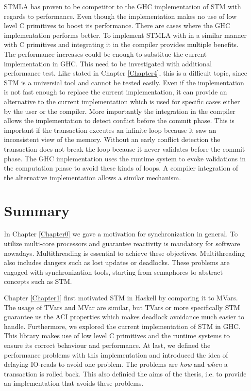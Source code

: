 STMLA has proven to be competitor to the GHC implementation of STM with regards to performance. Even 
though the implementation makes no use of low level C primitives to boost its performance. There are 
cases where the GHC implementation performs better. To implement STMLA with in a similar manner 
with C primitives and integrating it in the compiler provides multiple benefits. The performance 
increases could be enough to substitue the current implementation in GHC. This need to be investigated
with additional performance test. Like stated in Chapter \ref{Chapter4}, this is a difficult topic,
since STM is a universial tool and cannot be tested easily. Even if the implementation is not fast
enough to replace the current implementation, it can provide an alternative to the current implementation
which is used for specific cases either by the user or the compiler. More importantly the integration
in the compiler allows the implementation to detect conflict before the commit phase. This is 
important if the transaction executes an infinite loop because it saw an inconsistent view of the 
memory. Without an early conflict detection the transaction does not break the loop because it never
validates before the commit phase. The GHC implementation uses the runtime system to evoke validations
in the computation phase to avoid these kinds of loops. A compiler integration of the alternative 
implementation allows a similar mechanism.

\section{Summary}
In Chapter \ref{Chapter0} we gave a motivation for synchronization in general. To utilize multi-core
processors and guarantee reactivity is mandatory for software nowadays. Multithreading is essential 
to achieve these objectives. Multithreading also includes dangers such as lost updates or deadlocks. 
These problems are engaged with synchronization tools, starting from semaphores to abstract concepts
such as STM.

Chapter \ref{Chapter1} first motivated STM in Haskell by comparing it to MVars. The usage of TVars 
and MVar are similar, but TVars or more specifically STM guarantee us the ACI properties which makes
deadlock avoidance much easier to handle. Furthermore, we explored the current implementation of STM
in GHC. This library makes use of low level C primitives and the runtime systems to ensure its 
correct behaviour and performance. At last, we defined the performance problems with this implementation
and introduced the idea of delaying IO-reads to avoid one problem. The problems are \textit{how} and 
\textit{when} a transaction is rolled back. This also definied the aims of the thesis, i.e. 
to provide an implementation that avoids these problems. 

